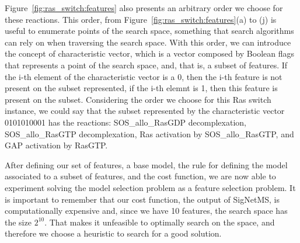 Figure~\ref{fig:ras_switch:features} also presents an arbitrary order we
choose for these reactions. This order, from Figure~\ref{fig:ras_switch:features}(a) to (j) is useful to
enumerate points of the search space, something that search algorithms
can rely on when traversing the search space. With this order, we can
introduce the concept of characteristic vector, which is a vector
composed by Boolean flags that represents a point of the search space,
and, that is, a subset of features. If the i-th element of the
characteristic vector is a 0, then the i-th feature is not present on 
the subset represented, if the i-th elemnt is 1, then this feature is
present on the subset. Considering the order we choose for this Ras
switch instance, we could say that the subset represented by the
characteristic vector 0101010001 has the reactions: SOS\_allo\_RasGDP
decomplexation, SOS\_allo\_RasGTP decomplexation, Ras activation by
SOS\_allo\_RasGTP, and GAP activation by RasGTP.

After defining our set of features, a base model, the rule for 
defining the model associated to a subset of features, and the cost
function, we are now able to experiment solving the model selection
problem as a feature selection problem. It is important to remember that
our cost function, the output of SigNetMS, is computationally expensive
and, since we have 10 features, the search space has the size $2^{10}$.
That makes it unfeasible to optimally search on the space, and therefore
we choose a heuristic to search for a good solution.

